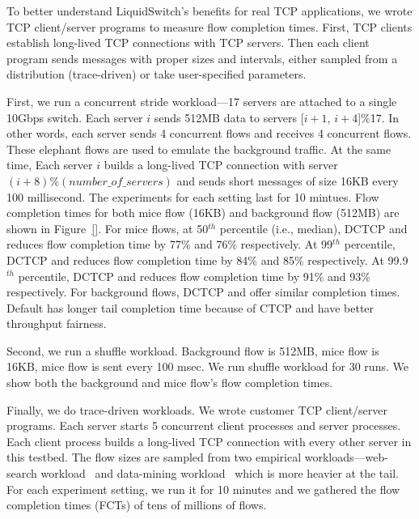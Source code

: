 To better understand LiquidSwitch's benefits for real TCP applications, 
we wrote TCP
client/server programs to measure flow completion times.
First, TCP clients establish long-lived TCP connections with TCP servers. 
Then each client program sends messages with proper sizes and intervals, 
either sampled from a distribution (trace-driven) or take user-specified parameters.

First, we run a concurrent stride workload---17 servers are attached to a single 10Gbps switch.
Each server $i$ sends 512MB data to servers [$i+1$, $i+4$]\%17.
In other words, each server sends 4 concurrent flows and receives 4 concurrent flows.
These elephant flows are used to emulate the background traffic.
At the same time, Each server $i$
builds a long-lived TCP connection with server $(i+8)\%(number\_of\_servers)$ and sends short messages
of size 16KB every 100 millisecond. The experiments for each setting last for 10 mintues.
Flow completion times for both mice flow (16KB) and background flow (512MB) are shown 
in Figure~\ref{}. For mice flows, at 50$^{th}$ percentile (i.e., median), DCTCP and \acdc{} 
reduces flow completion time by 77\% and 76\% respectively. 
At 99$^{th}$ percentile, DCTCP and \acdc{} reduces flow completion time by 84\% and 85\% respectively. 
At 99.9$^{th}$ percentile, DCTCP and \acdc{} reduces flow completion time by 91\% and 93\% respectively.
For background flows, DCTCP and \acdc{} offer similar completion times. 
Default has longer tail completion time because of CTCP and \acdc{} have better throughput fairness.


Second, we run a shuffle workload. Background flow is 512MB, mice flow is 16KB, mice flow is sent every
100 msec. We run shuffle workload for 30 runs.
We show both the background and mice flow's flow completion times.

Finally, we do trace-driven workloads. We wrote customer TCP client/server programs.
Each server starts 5 concurrent client processes and server processes.
Each client process builds a long-lived TCP connection with every other server in this testbed.
The flow sizes are sampled from two empirical workloads---web-search workload~\cite{alizadeh2011data}
and data-mining workload~\cite{greenberg2009vl2,alizadeh2014conga} which is more heavier at the tail.
For each experiment setting, we run it for 10 minutes and we gathered the flow completion times (FCTs) of tens of millions of flows.
